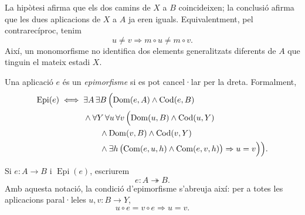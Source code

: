 \begin{center}
\end{center}

La hipòtesi afirma que els dos camins de \(X\) a \(B\) coincideixen; la conclusió afirma que les dues aplicacions de \(X\) a \(A\) ja eren iguals. Equivalentment, pel contrarecíproc, tenim
\[
u\ne v\Longrightarrow m\circ u\ne m\circ v.
\]
Així, un monomorfisme no identifica dos elements generalitzats diferents de \(A\) que tinguin el mateix estadi \(X\).

\begin{definicio}[Epimorfisme]\label{def:epimorfisme}
Una aplicació \(e\) és un \emph{epimorfisme} si es pot cancel·lar per la dreta. Formalment,
\[
\begin{aligned}
\operatorname{Epi}(e)
\iff {}&
\exists A\,\exists B\,\Bigl(
\operatorname{Dom}(e,A)\land\operatorname{Cod}(e,B)
\\
&{}\land
\forall Y\,\forall u\,\forall v\,
\Bigl(
\operatorname{Dom}(u,B)\land\operatorname{Cod}(u,Y)
\\
&\qquad{}\land\operatorname{Dom}(v,B)\land\operatorname{Cod}(v,Y)
\\
&\qquad{}\land\exists h\,
\bigl(\operatorname{Com}(e,u,h)\land\operatorname{Com}(e,v,h)\bigr)
\Rightarrow u=v
\Bigr)
\Bigr).
\end{aligned}
\]
\end{definicio}

\begin{notacio}\label{not:epi}
Si \(e:A\to B\) i \(\operatorname{Epi}(e)\), escriurem
\[
e:A\twoheadrightarrow B.
\]
Amb aquesta notació, la condició d'epimorfisme s'abreuja així: per a totes les aplicacions paral·leles \(u,v:B\to Y\),
\[
u\circ e=v\circ e\Longrightarrow u=v.
\]
\end{notacio}

